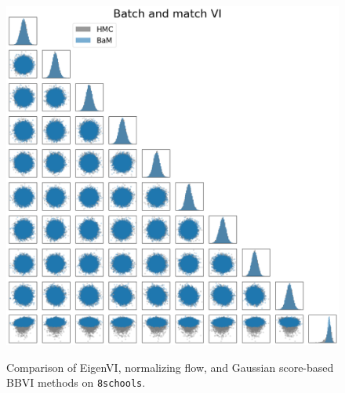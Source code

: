 \begin{figure}
    \\
    \includegraphics[scale=0.23]{figs/expts-pdb/PDB_85_corner_bam.png}
    \caption{Comparison of EigenVI, normalizing flow,
    and Gaussian score-based BBVI methods on
\texttt{8schools}.
    }
\label{fig:8schools:corner}
\end{figure}

